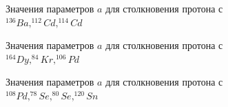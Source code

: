 \documentclass[14pt, a4paper]{article}
\numberwithin{figure}{section}
\numberwithin{equation}{section}
\begin{document}
\begin{figure}
	\caption{Значения параметров $a$ для столкновения протона с $^{136}Ba, ^{112}Cd, ^{114}Cd$}
	\label{ris:a-1}
\end{figure}
\begin{figure}
	\caption{Значения параметров $a$ для столкновения протона с $^{164}Dy, ^{84}Kr, ^{106}Pd$}
	\label{ris:a-2}
\end{figure}
\begin{figure}
	\caption{Значения параметров $a$ для столкновения протона с $^{108}Pd, ^{78}Se, ^{80}Se, ^{120}Sn$}
	\label{ris:a-3}
\end{figure}
\end{document}
